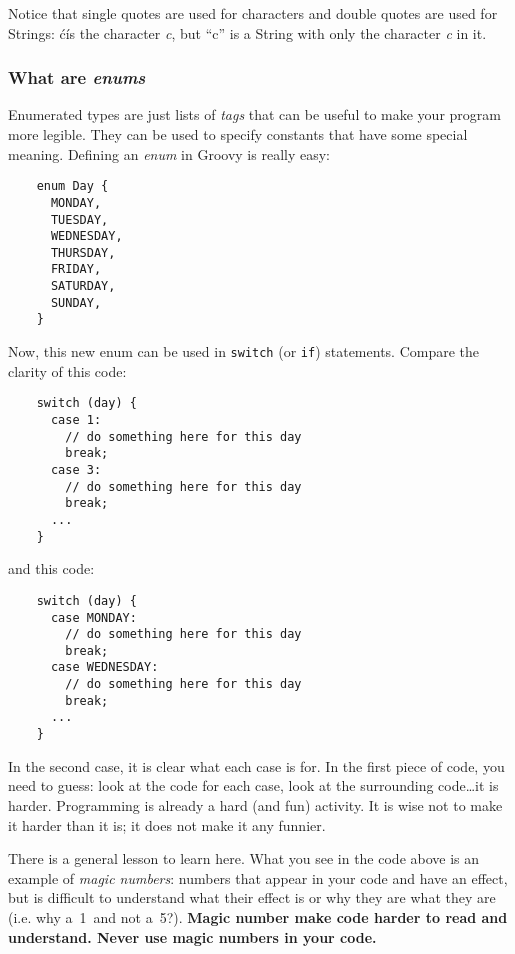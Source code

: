 Notice that single quotes are used for characters and double quotes
are used for Strings: \'c\' is the character \emph{c}, but ``c'' is a
String with only the character \emph{c} in it. 

\subsubsection{What are \emph{enums}}
\label{sec:what-types-enum}

Enumerated types are just lists of \emph{tags} that can be useful to
make your program more legible. They can be used to specify constants
that have some special meaning. Defining an \emph{enum} in Groovy is
really easy: 

\begin{verbatim}
    enum Day {
      MONDAY,
      TUESDAY,
      WEDNESDAY,
      THURSDAY,
      FRIDAY,
      SATURDAY,
      SUNDAY,
    }
\end{verbatim}

Now, this new enum can be used in \texttt{switch} (or \texttt{if})
statements. Compare the clarity of this code:

\begin{verbatim}
    switch (day) {
      case 1: 
        // do something here for this day
        break;
      case 3: 
        // do something here for this day
        break;
      ...
    }
\end{verbatim}

and this code:

\begin{verbatim}
    switch (day) {
      case MONDAY: 
        // do something here for this day
        break;
      case WEDNESDAY: 
        // do something here for this day
        break;
      ...
    }
\end{verbatim}

In the second case, it is clear what each case is for. In the first
piece of code, you need to guess: look at the code for each case, look
at the surrounding code\ldots it is harder. Programming is already a
hard (and fun) activity. It is wise not to make it harder than it is;
it does not make it any funnier. 

There is a general lesson to learn here. What you see in the code
above is an example of \emph{magic numbers}: numbers that appear in
your code and have an effect, but is difficult to understand what
their effect is or why they are what they are (i.e. why a~1~and not
a~5?). \textbf{Magic number make code harder to read and
  understand. Never use magic numbers in your code.}

